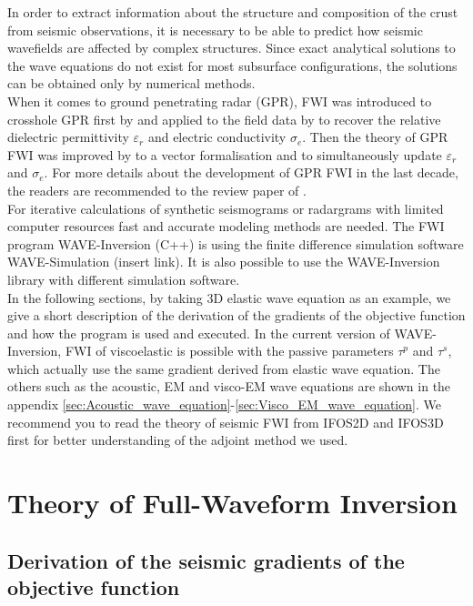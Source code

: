 \documentclass[pdftex,a4paper,parskip,listof=totoc,bibliography=totoc,onehalfspacing,12pt]{scrreprt}
\begin{document}
In order to extract information about the structure and composition of the crust from seismic observations, it is necessary to be able to predict how seismic wavefields are affected by complex structures. Since exact analytical
solutions to the wave equations do not exist for most subsurface configurations, the solutions can be obtained only by numerical methods. \\
When it comes to ground penetrating radar (GPR), FWI was introduced to crosshole GPR first by \cite{ernst2007full} and applied to the field data by \cite{ernst2007application} to recover the relative dielectric permittivity $\varepsilon_r$ and electric conductivity $\sigma_e$. Then the theory of GPR FWI was improved by \cite{meles2010new} to a vector formalisation and to simultaneously update  $\varepsilon_r$ and $\sigma_e$. For more details about the development of GPR FWI in the last decade, the readers are recommended to the review paper of \cite{klotzsche2019review}.\\
For iterative calculations of synthetic seismograms or radargrams with limited computer resources fast and accurate modeling methods are needed. The FWI program WAVE-Inversion (C++) is using the finite difference simulation software WAVE-Simulation (insert link). It is also possible to use the WAVE-Inversion library with different simulation software.\\
In the following sections, by taking 3D elastic wave equation as an example, we give a short description of the derivation of the gradients of the objective function and how the program is used and executed. In the current version of WAVE-Inversion, FWI of viscoelastic is possible with the passive parameters $\tau^p$ and $\tau^s$, which actually use the same gradient derived from elastic wave equation. The others such as the acoustic, EM and visco-EM wave equations are shown in the appendix \ref{sec:Acoustic_wave_equation}-\ref{sec:Visco_EM_wave_equation}.
We recommend you to read the theory of seismic FWI from IFOS2D and IFOS3D first for better understanding of the adjoint method we used. 
\cleardoublepage
\part{Theory of Full-Waveform Inversion}

\chapter{Derivation of the seismic gradients of the objective function}
\end{document}
